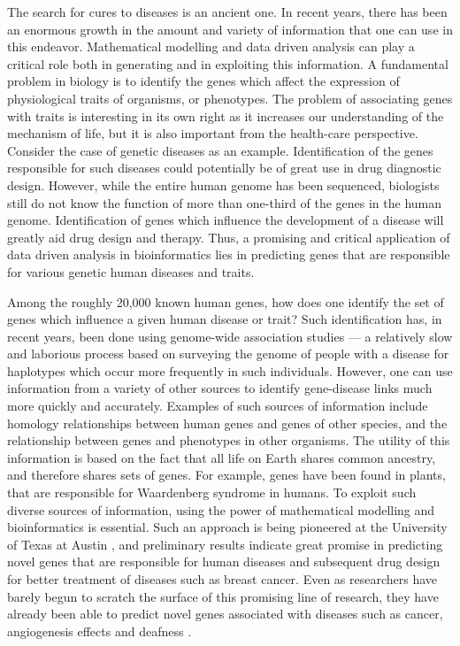 The search for cures to diseases is an ancient one. In recent years, there has been an enormous growth in the amount and variety of information that one can use in this endeavor. Mathematical modelling and data driven analysis can play a critical role both in generating and in exploiting this information. A fundamental problem in biology is to identify the genes which affect the expression of physiological traits of organisms, or phenotypes. The problem of associating genes with traits is interesting in its own right as it increases our understanding of the mechanism of life, but it is also important from the health-care perspective. Consider the case of genetic diseases as an example. Identification of the genes responsible for such diseases could potentially be of great use in drug diagnostic design. However, while the entire human genome has been sequenced, biologists still do not know the function of more than one-third of the genes in the human genome. Identification of genes which influence the development of a disease will greatly aid drug design and therapy. Thus, a promising and critical application of data driven analysis in bioinformatics lies in predicting genes that are responsible for various genetic human diseases and traits.

Among the roughly 20,000 known human genes, how does one identify the set of genes which influence a given human disease or trait? Such identification has, in recent years, been done using genome-wide association studies\cite{GWAurl} --- a relatively slow and laborious process based on surveying the genome of people with a disease for haplotypes which occur more frequently in such individuals. However, one can use information from a variety of other sources to identify gene-disease links much more quickly and accurately. Examples of such sources of information include homology relationships between human genes and genes of other species, and the relationship between genes and phenotypes in other organisms. The utility of this information is based on the fact that all life on Earth shares common ancestry, and therefore shares sets of genes. For example, genes have been found in plants, that are responsible for Waardenberg syndrome in humans. To exploit such diverse sources of information, using the power of mathematical modelling and bioinformatics is essential. Such an approach is being pioneered at the University of Texas at Austin \cite{McGaryOrthologousPhenotypes}, and preliminary results indicate great promise in predicting novel genes that are responsible for human diseases and subsequent drug design for better treatment of diseases such as breast cancer. Even as researchers have barely begun to scratch the surface of this promising line of research, they have already been able to predict novel genes associated with diseases such as cancer, angiogenesis effects and deafness \cite{newsMarcotteNY, newsMarcotte}.

